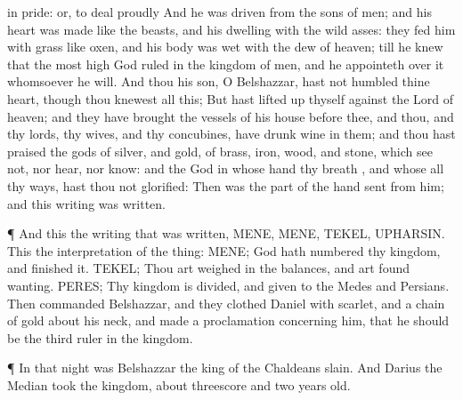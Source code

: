 {{in pride: or, to deal proudly}
And he was
driven
from the
sons of
men; and his
heart was
made
like the
beasts, and his
dwelling
{} with the wild
asses: they
fed him with
grass like
oxen, and his
body was
wet with the
dew of
heaven;
till he
knew that the most
high
God
ruled in the
kingdom of
men, and
{} he
appointeth
over it
whomsoever he
will.
And
thou his
son, O
Belshazzar, hast
not
humbled thine
heart,
though thou
knewest
all
this;
But hast lifted
up thyself
against the
Lord of
heaven; and they have
brought the
vessels of his
house
before thee, and
thou, and thy
lords, thy
wives, and thy
concubines, have
drunk
wine in them; and thou hast
praised the
gods of
silver, and
gold, of
brass,
iron,
wood, and
stone, which
see
not,
nor
hear,
nor
know: and the
God in whose
hand thy
breath
{}, and whose
{}
all thy
ways, hast thou
not
glorified:
Then was the
part of the
hand
sent
from
him; and
this
writing was
written.
\par }{\PP {}¶ And
this
{} the
writing that was
written,
MENE,
MENE,
TEKEL,
UPHARSIN.
This
{} the
interpretation of the
thing:
MENE;
God hath
numbered thy
kingdom, and
finished it.
TEKEL; Thou art
weighed in the
balances, and art
found
wanting.
PERES; Thy
kingdom is
divided, and
given to the
Medes and
Persians.
Then
commanded
Belshazzar, and they
clothed
Daniel with
scarlet, and
{} a
chain of
gold
about his
neck, and made a
proclamation
concerning him, that he should
be the
third
ruler in the
kingdom.
\par }{\PP {}¶ In that
night was
Belshazzar the
king of the
Chaldeans
slain.
And
Darius the
Median
took the
kingdom,
{} about
threescore and
two
years
old.

}
